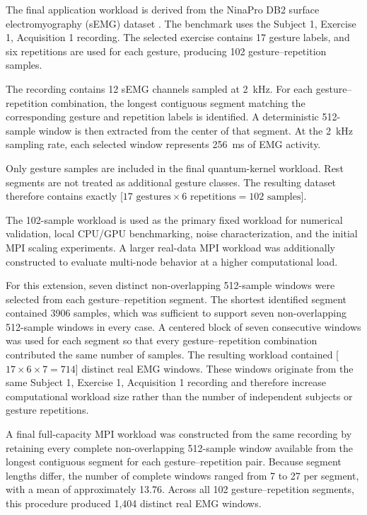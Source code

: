 \documentclass[pdflatex,sn-mathphys-num]{sn-jnl}%
\theoremstyle{thmstyleone}%
\theoremstyle{thmstyletwo}%
\theoremstyle{thmstylethree}%
\begin{document}
The final application workload is derived from the NinaPro DB2 surface
electromyography (sEMG) dataset \cite{atzori2014ninapro}. The benchmark uses the
Subject 1, Exercise 1, Acquisition 1 recording. The selected exercise contains
17 gesture labels, and six repetitions are used for each gesture, producing
102 gesture--repetition samples.

The recording contains 12 sEMG channels sampled at 2~kHz. For each
gesture--repetition combination, the longest contiguous segment matching the
corresponding gesture and repetition labels is identified. A deterministic
512-sample window is then extracted from the center of that segment. At the
2~kHz sampling rate, each selected window represents 256~ms of EMG activity.

Only gesture samples are included in the final quantum-kernel workload. Rest
segments are not treated as additional gesture classes. The resulting dataset
therefore contains exactly [\(17 \text{ gestures} \times 6 \text{ repetitions} = 102 \text{ samples}\)].

The 102-sample workload is used as the primary fixed workload for numerical
validation, local CPU/GPU benchmarking, noise characterization, and the initial
MPI scaling experiments. A larger real-data MPI workload was additionally
constructed to evaluate multi-node behavior at a higher computational load.

For this extension, seven distinct non-overlapping 512-sample windows were
selected from each gesture--repetition segment. The shortest identified segment
contained 3906 samples, which was sufficient to support seven non-overlapping
512-sample windows in every case. A centered block of seven consecutive windows
was used for each segment so that every gesture--repetition combination
contributed the same number of samples. The resulting workload contained [\(17 \times 6 \times 7 = 714\)] distinct real EMG windows. These windows originate from the same Subject 1,
Exercise 1, Acquisition 1 recording and therefore increase computational
workload size rather than the number of independent subjects or gesture
repetitions.

A final full-capacity MPI workload was constructed from the same recording by
retaining every complete non-overlapping 512-sample window available from the
longest contiguous segment for each gesture--repetition pair. Because segment
lengths differ, the number of complete windows ranged from 7 to 27 per segment,
with a mean of approximately 13.76. Across all 102 gesture--repetition
segments, this procedure produced 1,404 distinct real EMG windows.
\end{document}
